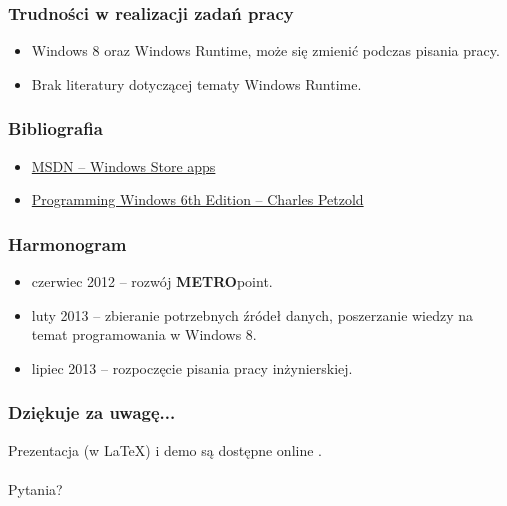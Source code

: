\documentclass{beamer}
\begin{document}
\begin{frame}
\frametitle{Trudności w realizacji zadań pracy}

\begin{itemize}
\item Windows 8 oraz Windows Runtime, może się zmienić podczas pisania pracy.
\item Brak literatury dotyczącej tematy Windows Runtime.
\end{itemize}
\end{frame}


\begin{frame}
\frametitle{Bibliografia} 
\begin{itemize}
\item \href{http://msdn.microsoft.com/en-us/windows/apps/}{MSDN -- Windows Store apps}
\item \href{http://www.charlespetzold.com/blog/2013/01/Programming-Windows-6th-Edition-Final-Ebook-Now-Available.html}{Programming Windows 6th Edition -- Charles Petzold}
\end{itemize}
\end{frame}


\begin{frame}
\frametitle{Harmonogram} 
\begin{itemize}
\item czerwiec 2012 -- rozwój \textbf{METRO}point.
\item luty 2013 -- zbieranie potrzebnych źródeł danych, poszerzanie wiedzy na temat programowania w Windows 8.
\item lipiec 2013 -- rozpoczęcie pisania pracy inżynierskiej.
\end{itemize}
\end{frame}


\begin{frame}
\frametitle{Dziękuje za uwagę...}
Prezentacja (w \LaTeX) i demo są dostępne online \href{http://github.com/soltys}{}. \\
\\
Pytania?

\end{frame}
\end{document}
